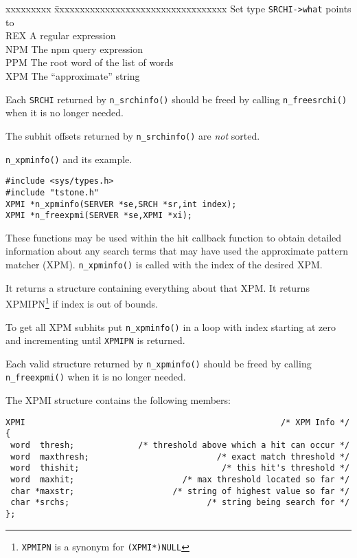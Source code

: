 \begin{tabbing}
xxxxxxxxx \= xxxxxxxxxxxxxxxxxxxxxxxxxxxxxxxxxx \kill
Set type  \> \verb`SRCHI->what` points to       \\
REX       \> A regular expression               \\
NPM       \> The npm query expression           \\
PPM       \> The root word of the list of words \\
XPM       \> The ``approximate'' string         \\
\end{tabbing}

Each \verb`SRCHI` returned by \verb`n_srchinfo()` should be freed by
calling \verb`n_freesrchi()` when it is no longer needed.

\CAVEATS
The subhit offsets returned by \verb`n_srchinfo()` are {\em not} sorted.

\SEE
\verb`n_xpminfo()` and its example.



\SYNOPSIS
\begin{verbatim}
#include <sys/types.h>
#include "tstone.h"
XPMI *n_xpminfo(SERVER *se,SRCH *sr,int index);
XPMI *n_freexpmi(SERVER *se,XPMI *xi);
\end{verbatim}

\DESCRIPTION

These functions may be used within the hit callback function to obtain
detailed information about any search terms that may have used the
approximate pattern matcher (XPM).  \verb`n_xpminfo()` is called with
the index of the desired XPM.

It returns a structure containing everything about that XPM.  It returns
XPMIPN\footnote{\verb`XPMIPN` is a synonym for \verb`(XPMI*)NULL`} if
index is out of bounds.

To get all XPM subhits put \verb`n_xpminfo()` in a loop with index
starting at zero and incrementing until \verb`XPMIPN` is returned.

Each valid structure returned by \verb`n_xpminfo()` should be freed by
calling \verb`n_freexpmi()` when it is no longer needed.

The XPMI structure contains the following members:
\begin{verbatim}
XPMI                                                    /* XPM Info */
{
 word  thresh;             /* threshold above which a hit can occur */
 word  maxthresh;                          /* exact match threshold */
 word  thishit;                             /* this hit's threshold */
 word  maxhit;                      /* max threshold located so far */
 char *maxstr;                    /* string of highest value so far */
 char *srchs;                            /* string being search for */
};

\end{verbatim}

